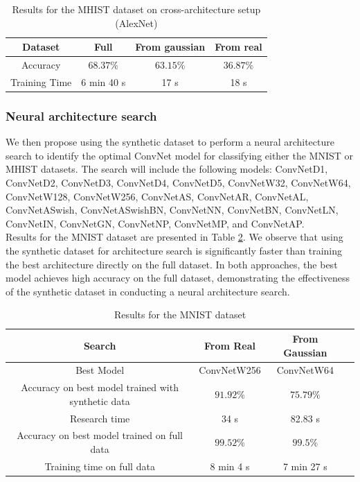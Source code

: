 \documentclass[onecolumn]{IEEEtran}
\begin{document}
\begin{table}[H]
    \centering
    \begin{tabular}{|c|c|c|c|}
        \hline
        Dataset & Full & From gaussian & From real \\
        \hline
        Accuracy & $68.37\%$ & $63.15\%$ & $36.87\%$ \\
        \hline
        Training Time & 6 min 40 s & 17 s & 18 s \\
        \hline
    \end{tabular}
    \caption{Results for the MHIST dataset on cross-architecture setup (AlexNet)}
    \label{tab:MHIST_results_cross_architecture}
\end{table}

\subsubsection{Neural architecture search}
We then propose using the synthetic dataset to perform a neural architecture search to identify the optimal ConvNet model for classifying either the MNIST or MHIST datasets. The search will include the following models: ConvNetD1, ConvNetD2, ConvNetD3, ConvNetD4, ConvNetD5, ConvNetW32, ConvNetW64, ConvNetW128, ConvNetW256, ConvNetAS, ConvNetAR, ConvNetAL, ConvNetASwish, ConvNetASwishBN, ConvNetNN, ConvNetBN, ConvNetLN, ConvNetIN, ConvNetGN, ConvNetNP, ConvNetMP, and ConvNetAP.
\\
Results for the MNIST dataset are presented in Table \ref{tab:NAS_results_MNIST}. We observe that using the synthetic dataset for architecture search is significantly faster than training the best architecture directly on the full dataset. In both approaches, the best model achieves high accuracy on the full dataset, demonstrating the effectiveness of the synthetic dataset in conducting a neural architecture search.

\begin{table}[H]
    \centering
    \begin{tabular}{|c|c|c|c|}
        \hline
        Search & From Real & From Gaussian \\
        \hline
        Best Model & ConvNetW256 & ConvNetW64\\
        \hline
        Accuracy on best model trained with synthetic data & $91.92\%$ & $75.79\%$ \\
        \hline
        Research time & 34 s & 82.83 s \\
        \hline
        Accuracy on best model trained on full data & $99.52\%$ & $99.5\%$ \\
        \hline
        Training time on full data & 8 min 4 s & 7 min 27 s \\
        \hline
    \end{tabular}
    \caption{Results for the MNIST dataset}
    \label{tab:NAS_results_MNIST}
\end{table}
\end{document}
